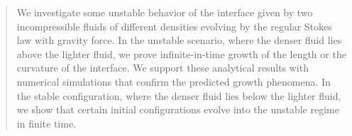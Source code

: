 \documentclass[11pt]{article}
\numberwithin{equation}{section}
\begin{document}
\maketitle
\begin{abstract}
We investigate some unstable behavior of the interface given by two incompressible fluids of different densities evolving by the regular Stokes law with gravity force. In the unstable scenario, where the denser fluid lies above the lighter fluid, we prove infinite-in-time growth of the length or the curvature of the interface. We support these analytical results with numerical simulations that confirm the predicted growth phenomena. In the stable configuration, where the denser fluid lies below the lighter fluid, we show that certain initial configurations evolve into the unstable regime in finite time. 
\end{abstract}



\end{document}
